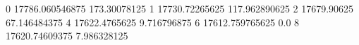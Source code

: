 0 17786.060546875 173.30078125
1 17730.72265625 117.962890625
2 17679.90625 67.146484375
4 17622.4765625 9.716796875
6 17612.759765625 0.0
8 17620.74609375 7.986328125
